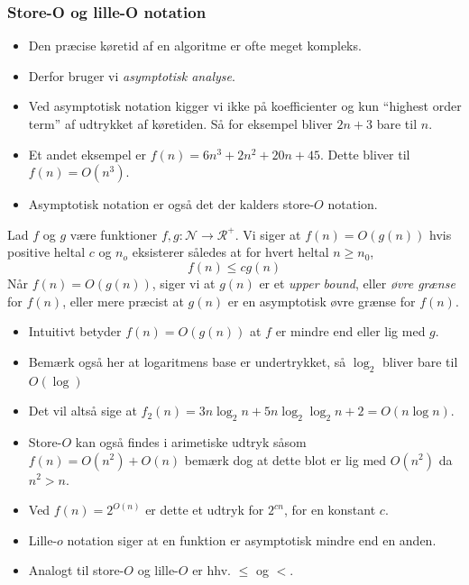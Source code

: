 \begin{frame}[allowframebreaks]
	\frametitle{Store-O og lille-O notation}
	\begin{itemize}
		\item Den præcise køretid af en algoritme er ofte meget kompleks.
		\item Derfor bruger vi \textit{asymptotisk analyse}.
		\item Ved asymptotisk notation kigger vi ikke på koefficienter og kun ``highest order term'' af udtrykket af køretiden. Så for eksempel bliver $2n+3$ bare til $n$.
		\item Et andet eksempel er $f(n) = 6n^{3} + 2n^{2}+20n+45$. Dette bliver til $f(n) = O(n^{3})$.
		\item Asymptotisk notation er også det der kalders store-$O$ notation.
	\end{itemize}

	\begin{definition}
		Lad $f$ og $g$ være funktioner $f,g : \mathcal{N} \rightarrow \mathcal{R}^{+}$. Vi siger at $f(n) = O(g(n))$ hvis positive heltal $c$ og $n_{o}$ eksisterer således at for hvert heltal $n \ge n_{0}$,
		\begin{equation}
			f(n) \le cg(n)
		\end{equation}
		Når $f(n) = O(g(n))$, siger vi at $g(n)$ er et \textit{upper bound}, eller \textit{øvre grænse} for $f(n)$, eller mere præcist at $g(n)$ er en asymptotisk øvre grænse for $f(n)$.
	\end{definition}
	\begin{itemize}
		\item Intuitivt betyder $f(n) = O(g(n))$ at $f$ er mindre end eller lig med $g$.
		\item Bemærk også her at logaritmens base er undertrykket, så $\log_{2}$ bliver bare til $O(\log)$
		\item Det vil altså sige at $f_{2}(n) = 3n \log_{2} n + 5n \log_{2}\log_{2}n+2 = O(n \log n)$.
		\item Store-$O$ kan også findes i arimetiske udtryk såsom $f(n) = O(n^{2})+O(n)$ bemærk dog at dette blot er lig med $O(n^{2})$ da $n^{2} > n$.
		\item Ved $f(n) = 2^{O(n)}$ er dette et udtryk for $2^{cn}$, for en konstant $c$.
		\item Lille-$o$ notation siger at en funktion er asymptotisk mindre end en anden.
		\item Analogt til store-$O$ og lille-$O$ er hhv. $\le$ og $<$.
	\end{itemize}


\end{frame}
